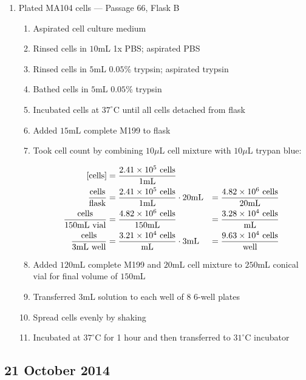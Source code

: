 \begin{enumerate}
	\item Plated MA104 cells --- Passage 66, Flask B
		\begin{enumerate}
			\item Aspirated cell culture medium
			\item Rinsed cells in $10$mL 1x PBS; aspirated PBS
			\item Rinsed cells in $5$mL $0.05$\% trypsin; aspirated trypsin
			\item Bathed cells in $5$mL $0.05$\% trypsin
			\item Incubated cells at $37^{\circ}$C until all cells detached from flask
			\item Added $15$mL complete M199 to flask
			\item Took cell count by combining $10\mu$L cell mixture with $10\mu$L trypan blue:
			
				\begin{align*}
				\text{[cells]} &= \frac{2.41\times 10^{5}\text{ cells}}{1\text{mL}} \\
				\frac{\text{cells}}{\text{flask}} &= \frac{2.41\times 10^{5}\text{ cells}}{1\text{mL}} \cdot 20\text{mL} &= \frac{4.82\times 10^{6}\text{ cells}}{20\text{mL}}\\
				\frac{\text{cells}}{150\text{mL vial}} &= \frac{4.82\times 10^{6}\text{ cells}}{150\text{mL}} &= \frac{3.28\times 10^{4}\text{ cells}}{\text{mL}}\\
				\frac{\text{cells}}{3\text{mL well}} &= \frac{3.21\times 10^{4}\text{ cells}}{\text{mL}} \cdot 3\text{mL} &= \frac{9.63\times 10^{4}\text{ cells}}{\text{well}}\\
				\end{align*}
			\item Added $120$mL complete M199 and $20$mL cell mixture to $250$mL conical vial for final volume of $150$mL
			\item Transferred $3$mL solution to each well of 8 6-well plates
			\item Spread cells evenly by shaking
			\item Incubated at $37^{\circ}$C for 1 hour and then transferred to $31^{\circ}$C incubator
		\end{enumerate}
\end{enumerate}

\subsection*{21 October 2014}

